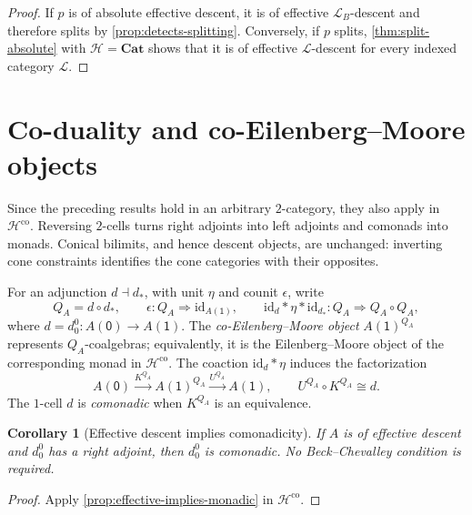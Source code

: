 \documentclass[11pt,a4paper]{article}
\numberwithin{equation}{section}
\newtheorem{corollary}[corollary]{Corollary}
\theoremstyle{definition}
\theoremstyle{remark}
\newcommand{\id}{\mathrm{id}}
\newcommand{\Hcat}{\mathcal H}
\newcommand{\Lx}{\mathcal L}
\newcommand{\Cat}{\mathbf{Cat}}
\begin{document}
\begin{proof}
If $p$ is of absolute effective descent, it is of effective
$\Lx_B$-descent and therefore splits by
\cref{prop:detects-splitting}. Conversely, if $p$ splits,
\cref{thm:split-absolute} with $\Hcat=\Cat$ shows that it is of
effective $\Lx$-descent for every indexed category $\Lx$.
\end{proof}

\section{Co-duality and co-Eilenberg--Moore objects}
\label{sec:codual}

Since the preceding results hold in an arbitrary $2$-category, they
also apply in $\Hcat^{\mathrm{co}}$. Reversing $2$-cells turns right
adjoints into left adjoints and comonads into monads. Conical bilimits,
and hence descent objects, are unchanged: inverting cone constraints
identifies the cone categories with their opposites.

For an adjunction $d\dashv d_*$, with unit $\eta$ and counit
$\epsilon$, write
\begin{equation}
  Q_A=d\circ d_*,\qquad
  \epsilon\colon Q_A\Rightarrow\id_{A(\mathsf1)},\qquad
  \id_d\ast\eta\ast\id_{d_*}\colon Q_A\Rightarrow Q_A\circ Q_A,
  \label{eq:codual-comonad}
\end{equation}
where $d=d_0^0\colon A(\mathsf0)\to A(\mathsf1)$.
The \emph{co-Eilenberg--Moore object} $A(\mathsf1)^{Q_A}$ represents
$Q_A$-coalgebras; equivalently, it is the Eilenberg--Moore object of
the corresponding monad in $\Hcat^{\mathrm{co}}$. The coaction
$\id_d\ast\eta$ induces the factorization
\begin{equation}
  A(\mathsf0)\xrightarrow{K^{Q_A}}A(\mathsf1)^{Q_A}
       \xrightarrow{U^{Q_A}}A(\mathsf1),\qquad
  U^{Q_A}\circ K^{Q_A}\cong d.
  \label{eq:coem-factorization}
\end{equation}
The $1$-cell $d$ is \emph{comonadic} when $K^{Q_A}$ is an equivalence.

\begin{corollary}[Effective descent implies comonadicity]
\label{prop:effective-implies-comonadic}
If $A$ is of effective descent and $d_0^0$ has a right adjoint,
then $d_0^0$ is comonadic. No Beck--Chevalley condition is required.
\end{corollary}
\begin{proof}
Apply \cref{prop:effective-implies-monadic} in $\Hcat^{\mathrm{co}}$.
\end{proof}
\end{document}
